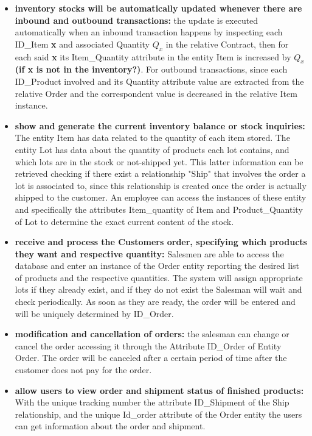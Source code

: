 \begin{itemize}
    \item \textbf{inventory stocks will be automatically updated whenever there are inbound and outbound transactions:} the update is executed automatically when an inbound transaction happens by inspecting each ID\_Item \textbf{x} and associated Quantity \(Q_x\) in the relative Contract, then for each said \textbf{x} its Item\_Quantity attribute in the entity Item is increased by  \(Q_x\) \textbf{(if x is not in the inventory?)}. For outbound transactions, since each ID\_Product involved and its Quantity attribute value are extracted from the relative Order and the correspondent value is decreased in the relative Item instance.
    \item \textbf{show and generate the current inventory balance or stock inquiries:} The entity Item has data related to the quantity of each item stored. The entity Lot has data about the quantity of products each lot contains, and which lots are in the stock or not-shipped yet. This latter information can be retrieved checking if there exist a relationship "Ship" that involves the order a lot is associated to, since this relationship is created once the order is actually shipped to the customer. An employee can access the instances of these entity and specifically the attributes Item\_quantity of Item and Product\_Quantity of Lot to determine the exact current content of the stock.
    \item \textbf{receive and process the Customers order, specifying which products they want and respective   quantity:} Salesmen are able to access the database and enter an instance of the Order entity reporting the desired list of products and the respective quantities. The system will assign appropriate lots if they already exist, and if they do not exist the Salesman will wait and check periodically. As soon as they are ready, the order will be entered and will be uniquely determined by ID\_Order.
    \item \textbf{modification and cancellation of orders:} the salesman can change or cancel the order accessing it through the Attribute ID\_Order of Entity Order. The order will be canceled after a certain period of time after the customer does not pay for the order.
    \item \textbf{allow users to view order and shipment status of finished products:} With the unique tracking number the attribute ID\_Shipment of the Ship relationship, and the unique Id\_order attribute of the Order entity the users can get information about the order and shipment.

\end{itemize}
